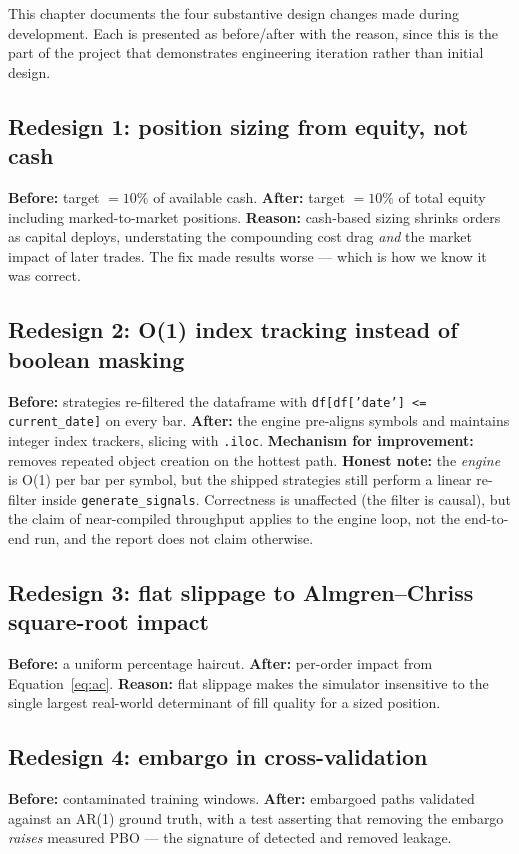 \documentclass[12pt,a4paper,oneside]{report}
\begin{document}
This chapter documents the four substantive design changes made during
development. Each is presented as before/after with the reason, since this is the
part of the project that demonstrates engineering iteration rather than initial
design.

\subsection*{Redesign 1: position sizing from equity, not cash}
\textbf{Before:} target $= 10\%$ of available cash. \textbf{After:} target
$= 10\%$ of total equity including marked-to-market positions. \textbf{Reason:}
cash-based sizing shrinks orders as capital deploys, understating the compounding
cost drag \emph{and} the market impact of later trades. The fix made results
worse --- which is how we know it was correct.

\subsection*{Redesign 2: O(1) index tracking instead of boolean masking}
\textbf{Before:} strategies re-filtered the dataframe with
\texttt{df[df['date'] <= current\_date]} on every bar. \textbf{After:} the engine
pre-aligns symbols and maintains integer index trackers, slicing with
\texttt{.iloc}. \textbf{Mechanism for improvement:} removes repeated object
creation on the hottest path. \textbf{Honest note:} the \emph{engine} is O(1) per
bar per symbol, but the shipped strategies still perform a linear re-filter inside
\texttt{generate\_signals}. Correctness is unaffected (the filter is causal), but
the claim of near-compiled throughput applies to the engine loop, not the
end-to-end run, and the report does not claim otherwise.

\subsection*{Redesign 3: flat slippage to Almgren--Chriss square-root impact}
\textbf{Before:} a uniform percentage haircut. \textbf{After:} per-order impact
from Equation~\ref{eq:ac}. \textbf{Reason:} flat slippage makes the simulator
insensitive to the single largest real-world determinant of fill quality for a
sized position.

\subsection*{Redesign 4: embargo in cross-validation}
\textbf{Before:} contaminated training windows. \textbf{After:} embargoed paths
validated against an AR(1) ground truth, with a test asserting that removing the
embargo \emph{raises} measured PBO --- the signature of detected and removed
leakage.
\end{document}
